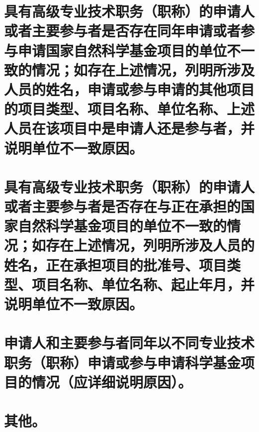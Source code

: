 \documentclass[UTF8, punct, oneside, fontset=none]{ctexbook}
\begin{document}
\section{具有高级专业技术职务（职称）的申请人或者主要参与者是否存在同年申请或者参与申请国家自然科学基金项目的单位不一致的情况；如存在上述情况，列明所涉及人员的姓名，申请或参与申请的其他项目的项目类型、项目名称、单位名称、上述人员在该项目中是申请人还是参与者，并说明单位不一致原因。}

\begin{MS}
	
\end{MS}

\section{具有高级专业技术职务（职称）的申请人或者主要参与者是否存在与正在承担的国家自然科学基金项目的单位不一致的情况；如存在上述情况，列明所涉及人员的姓名，正在承担项目的批准号、项目类型、项目名称、单位名称、起止年月，并说明单位不一致原因。}

\begin{MS}
	
\end{MS}

\section{申请人和主要参与者同年以不同专业技术职务（职称）申请或参与申请科学基金项目的情况（应详细说明原因）。}

\begin{MS}
	
\end{MS}

\section{其他。}

\begin{MS}
	
\end{MS}
\end{document}
